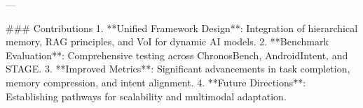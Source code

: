 ---

### Contributions  
1. **Unified Framework Design**: Integration of hierarchical memory, RAG principles, and VoI for dynamic AI models.  
2. **Benchmark Evaluation**: Comprehensive testing across ChronosBench, AndroidIntent, and STAGE.  
3. **Improved Metrics**: Significant advancements in task completion, memory compression, and intent alignment.  
4. **Future Directions**: Establishing pathways for scalability and multimodal adaptation.

